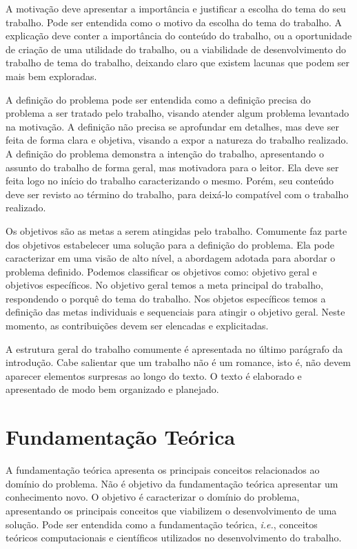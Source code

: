 \documentclass[12pt]{article}
\begin{document}
	A motivação deve apresentar a importância e justificar a escolha do tema do seu trabalho. Pode ser entendida como o motivo da escolha do tema do trabalho. A explicação deve conter a importância do conteúdo do trabalho, ou a oportunidade de criação de uma utilidade do trabalho, ou a viabilidade de desenvolvimento do trabalho de tema do trabalho, deixando claro que existem lacunas que podem ser mais bem exploradas. 
	
	A definição do problema pode ser entendida como a definição precisa do problema a ser tratado pelo trabalho, visando atender algum problema levantado na motivação. A definição não precisa se aprofundar em detalhes, mas deve ser feita de forma clara e objetiva, visando a expor a natureza do trabalho realizado. A definição do problema demonstra a intenção do trabalho, apresentando o assunto do trabalho de forma geral, mas motivadora para o leitor. Ela deve ser feita logo no início do trabalho caracterizando o mesmo. Porém, seu conteúdo deve ser revisto ao término do trabalho, para deixá-lo compatível com o trabalho realizado.
	
	Os objetivos são as metas a serem atingidas pelo trabalho. Comumente faz parte dos objetivos estabelecer uma solução para a definição do problema. Ela pode caracterizar em uma visão de alto nível, a abordagem adotada para abordar o problema definido. Podemos classificar os objetivos como: objetivo geral e objetivos específicos. No objetivo geral temos a meta principal do trabalho, respondendo o porquê do tema do trabalho. Nos objetos específicos temos a definição das metas individuais e sequenciais para atingir o objetivo geral. Neste momento, as contribuições devem ser elencadas e explicitadas.
	
	A estrutura geral do trabalho comumente é apresentada no último parágrafo da introdução. Cabe salientar que um trabalho não é um romance, isto é, não devem aparecer elementos surpresas ao longo do texto. O texto é elaborado e apresentado de modo bem organizado e planejado. 
	
	\section{Fundamentação Teórica}
	\label{sec:fund_teorica}
	
	A fundamentação teórica apresenta os principais conceitos relacionados ao domínio do problema. Não é objetivo da fundamentação teórica apresentar um conhecimento novo. O objetivo é caracterizar o domínio do problema, apresentando os principais conceitos que viabilizem o desenvolvimento de uma solução. Pode ser entendida como a fundamentação teórica, \emph{i.e.}, conceitos teóricos computacionais e científicos utilizados no desenvolvimento do trabalho.
	
\end{document}
